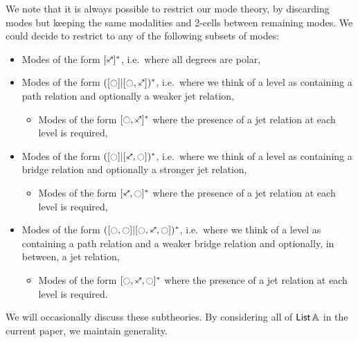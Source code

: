 \documentclass[a4paper]{article}
\begin{document}
\begin{remark} 
	We note that it is always possible to restrict our mode theory, by discarding modes but keeping the same modalities and 2-cells between remaining modes.
	We could decide to restrict to any of the following subsets of modes:
	\begin{itemize}
		\item Modes of the form $[\ypolar]^*$, i.e.\ where all degrees are polar,
		\item Modes of the form $([\npolar] | [\npolar, \ypolar])^*$, i.e.\ where we think of a level as containing a path relation and optionally a weaker jet relation,
		\begin{itemize}
			\item Modes of the form $[\npolar, \ypolar]^*$ where the presence of a jet relation at each level is required,
		\end{itemize}
		\item Modes of the form $([\npolar] | [\ypolar, \npolar])^*$, i.e.\ where we think of a level as containing a bridge relation and optionally a stronger jet relation,
		\begin{itemize}
			\item Modes of the form $[\ypolar, \npolar]^*$ where the presence of a jet relation at each level is required,
		\end{itemize}
		\item Modes of the form $([\npolar, \npolar] | [\npolar, \ypolar, \npolar])^*$, i.e.\ where we think of a level as containing a path relation and a weaker bridge relation and optionally, in between, a jet relation,
		\begin{itemize}
			\item Modes of the form $[\npolar, \ypolar, \npolar]^*$ where the presence of a jet relation at each level is required.
		\end{itemize}
	\end{itemize}
	We will occasionally discuss these subtheories. By considering all of ${\mathsf{List}}\,{\mathbb{A}}$ in the current paper, we maintain generality.
\end{remark}
\end{document}
